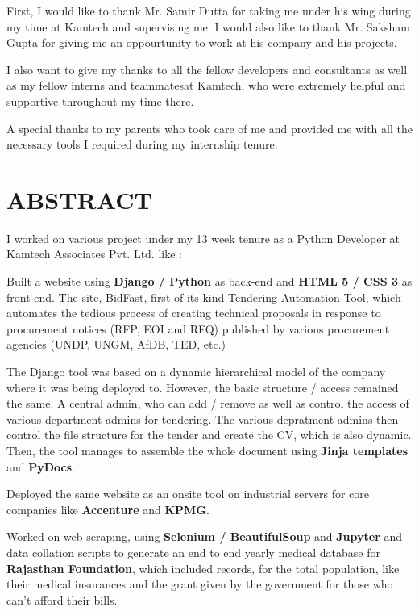 \documentclass[14pt]{extarticle}
\begin{document}
\par First, I would like to thank Mr. Samir Dutta for taking me under his wing during my time at Kamtech and supervising me. I would also like to thank Mr. Saksham Gupta for giving me an oppourtunity to work at his company and his projects.

\par I also want to give my thanks to all the fellow developers and consultants as well as my fellow interns and teammatesat Kamtech, who were extremely helpful and supportive throughout my time there.

\par A special thanks to my parents who took care of me and provided me with all the necessary tools I required during my internship tenure.


\newpage
{}
\listoffigures

\newpage
{}
\section*{ABSTRACT}
\onehalfspacing

I worked on various project under my 13 week tenure as a Python Developer at Kamtech Associates Pvt. Ltd. like :

Built a website using \textbf{Django / Python} as back-end and \textbf{HTML 5 / CSS 3} as front-end. The site, \href{https://edubild.com/bidfast/}{BidFast}, first-of-its-kind Tendering Automation Tool, which automates the tedious process of creating technical proposals in response to procurement notices (RFP, EOI and RFQ) published by various procurement agencies (UNDP, UNGM, AfDB, TED, etc.)

The Django tool was based on a dynamic hierarchical model of the company where it was being deployed to. However, the basic structure / access remained the same. A central admin, who can add / remove as well as control the access of various department admins for tendering. The various depratment admins then control the file structure for the tender and create the CV, which is also dynamic. Then, the tool manages to assemble the whole document using \textbf{Jinja templates} and \textbf{PyDocs}.

Deployed the same website as an onsite tool on industrial servers for core companies like \textbf{Accenture} and \textbf{KPMG}.

Worked on web-scraping, using \textbf{Selenium / BeautifulSoup} and \textbf{Jupyter} and data collation scripts to generate an end to end yearly medical database for \textbf{Rajasthan Foundation}, which included records, for the total population, like their medical insurances and the grant given by the government for those who can't afford their bills.
\end{document}
